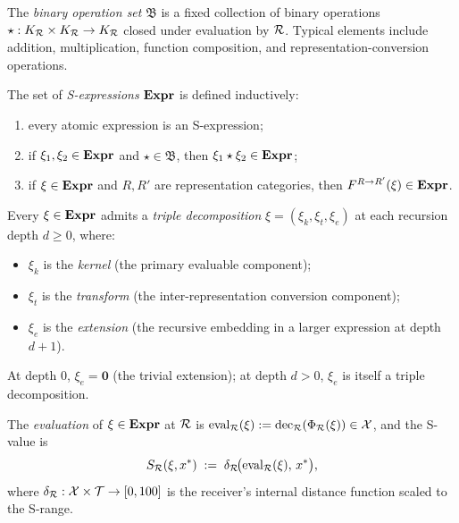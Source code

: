 \begin{definition}\label{def:bin-ops}
The \emph{binary operation set} $\mathfrak{B}$ is a fixed collection of binary operations $\star : K_{\mathcal{R}} \times K_{\mathcal{R}} \to K_{\mathcal{R}}$ closed under evaluation by $\mathcal{R}$. Typical elements include addition, multiplication, function composition, and representation-conversion operations.
\end{definition}

\begin{definition}[S-expression]\label{def:s-expression}
The set of \emph{S-expressions} $\mathbf{Expr}$ is defined inductively:
\begin{enumerate}[nosep, label=(\roman*)]
  \item every atomic expression is an S-expression;
  \item if $\xi_1, \xi_2 \in \mathbf{Expr}$ and $\star \in \mathfrak{B}$, then $\xi_1 \star \xi_2 \in \mathbf{Expr}$;
  \item if $\xi \in \mathbf{Expr}$ and $R, R'$ are representation categories, then $F^{R \to R'}(\xi) \in \mathbf{Expr}$.
\end{enumerate}
\end{definition}

\begin{definition}\label{def:triple-decomp}
Every $\xi \in \mathbf{Expr}$ admits a \emph{triple decomposition} $\xi = (\xi_k, \xi_t, \xi_e)$ at each recursion depth $d \geq 0$, where:
\begin{itemize}[nosep]
  \item $\xi_k$ is the \emph{kernel} (the primary evaluable component);
  \item $\xi_t$ is the \emph{transform} (the inter-representation conversion component);
  \item $\xi_e$ is the \emph{extension} (the recursive embedding in a larger expression at depth $d+1$).
\end{itemize}
At depth $0$, $\xi_e = \mathbf{0}$ (the trivial extension); at depth $d > 0$, $\xi_e$ is itself a triple decomposition.
\end{definition}

\begin{definition}[S-evaluation]\label{def:s-eval}
The \emph{evaluation} of $\xi \in \mathbf{Expr}$ at $\mathcal{R}$ is $\mathrm{eval}_{\mathcal{R}}(\xi) := \mathrm{dec}_{\mathcal{R}}(\Phi_{\mathcal{R}}(\xi)) \in \mathcal{X}$, and the S-value is
\[
S_{\mathcal{R}}(\xi, x^*) \;:=\; \delta_{\mathcal{R}}\!\bigl(\mathrm{eval}_{\mathcal{R}}(\xi),\, x^*\bigr),
\]
where $\delta_{\mathcal{R}} : \mathcal{X} \times \mathcal{T} \to [0,100]$ is the receiver's internal distance function scaled to the S-range.
\end{definition}

